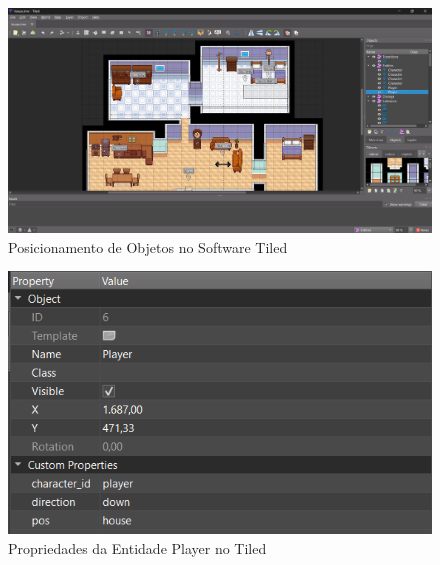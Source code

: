 \begin{figure}[h!]
    \centering
    \includegraphics[width=1\linewidth]{figuras/tiled-house.png}
    \caption{Posicionamento de Objetos no Software Tiled }
    \label{fig:tiled-house}
\end{figure}

\begin{figure}[h!]
    \centering
    \includegraphics[width=1\linewidth]{figuras/tiled-player-properties.png}
    \caption{Propriedades da Entidade Player no Tiled}
    \label{fig:tiled-player-propertiesl}
\end{figure}

